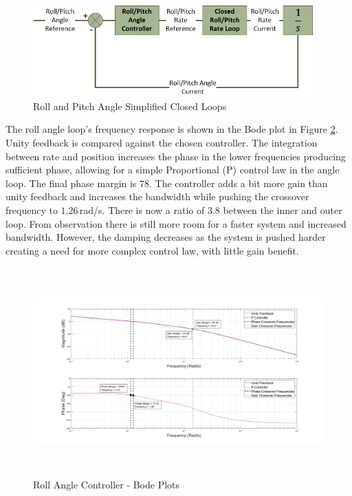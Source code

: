 \documentclass[12pt]{report}
\begin{document}
\begin{figure}[H]
	\centering
	\includegraphics[height = 3.5cm]{../References/Diagrams/RollPitchAngleLoop.jpg}
	\caption{Roll and Pitch Angle Simplified Closed Loops}
	\label{IM_RollAngleLoop}
\end{figure}

The roll angle loop's frequency response is shown in the Bode plot in Figure \ref{IM_RollAngleControlBode}. Unity feedback is compared against the chosen controller. The integration between rate and position increases the phase in the lower frequencies producing sufficient phase, allowing for a simple Proportional (P) control law in the angle loop. The final phase margin is $78$\textdegree. The controller adds a bit more gain than unity feedback and increases the bandwidth while pushing the crossover frequency to $1.26$\,rad/s. There is now a ratio of $3.8$ between the inner and outer loop. From observation there is still more room for a faster system and increased bandwidth. However, the damping decreases as the system is pushed harder creating a need for more complex control law, with little gain benefit.

\begin{figure}[H]
	\centering
	\includegraphics[height = 8cm]{../Design/Matlab/Controllers/roll_angle_bode.jpg}
	\caption{Roll Angle Controller -  Bode Plots}
	\label{IM_RollAngleControlBode}
\end{figure}
\end{document}
